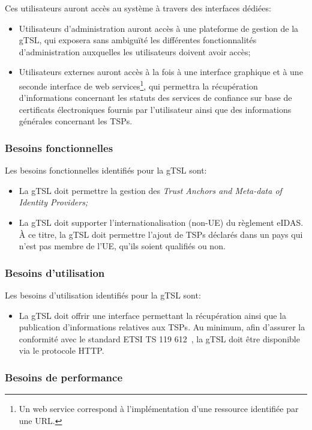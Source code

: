 \documentclass{tnreport}
\begin{document}
Ces utilisateurs auront accès au système à travers des interfaces dédiées:
\begin{itemize}
	\item Utilisateurs d'administration auront accès à une plateforme de gestion de la gTSL, qui exposera sans ambiguïté les différentes fonctionnalités d'administration auxquelles les utilisateurs doivent avoir accès;
	\item Utilisateurs externes auront accès à la fois à une interface graphique et à une seconde interface de web services\footnote{Un web service correspond à l'implémentation d'une ressource identifiée par une URL.}, qui permettra la récupération d'informations concernant les statuts des services de confiance sur base de certificats électroniques fournis par l'utilisateur ainsi que des informations générales concernant les TSPs.
\end{itemize}

\subsubsection{Besoins fonctionnelles}

Les besoins fonctionnelles identifiés pour la gTSL sont:
\begin{itemize}
	\item La gTSL doit permettre la gestion des {\em Trust Anchors and Meta-data of Identity Providers;}
	\item La gTSL doit supporter l'internationalisation (non-UE) du règlement eIDAS. À ce titre, la gTSL doit permettre l'ajout de TSPs déclarés dans un pays qui n'est pas membre de l'UE, qu'ils soient qualifiés ou non.
\end{itemize}

\subsubsection{Besoins d'utilisation}

Les besoins d'utilisation identifiés pour la gTSL sont:
\begin{itemize}
	\item La gTSL doit offrir une interface permettant la récupération ainsi que la publication d'informations relatives aux TSPs. Au minimum, afin d'assurer la conformité avec le standard ETSI TS 119 612~\cite{ETSITS119612}, la gTSL doit être disponible via le protocole HTTP.
\end{itemize}

\subsubsection{Besoins de performance}
\end{document}
